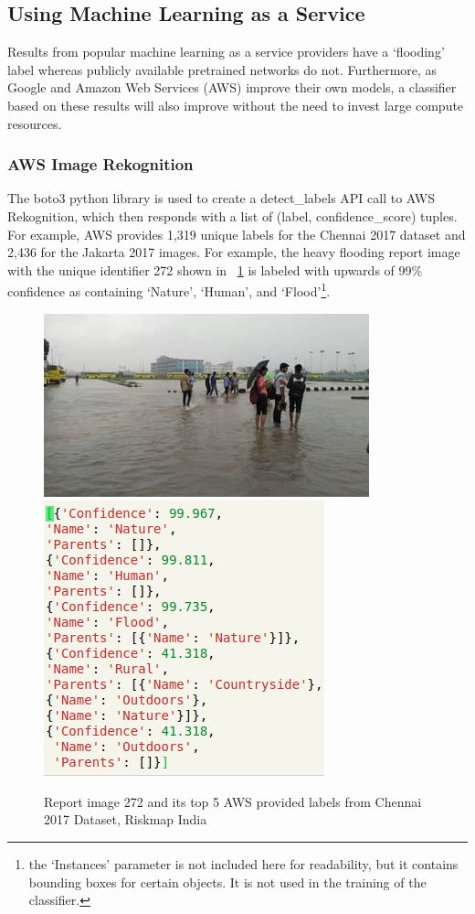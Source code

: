 \subsection{Using Machine Learning as a Service}
Results from popular machine learning as a service providers have a `flooding'
label whereas publicly available pretrained networks do not. Furthermore, as
Google and Amazon Web Services (AWS) improve their own models, a classifier
based on these results will also improve without the need to invest large
compute resources.

\subsubsection{AWS Image Rekognition}\label{chap4:aws}
The boto3 python library is used to create a detect\_labels API call 
to AWS Rekognition, which then responds with a list of (label,
confidence\_score) tuples. For example, AWS provides 1,319 unique labels for the
Chennai 2017 dataset and 2,436 for the Jakarta 2017 images. For example, the
heavy flooding report image with the unique identifier 272 shown in
\figureautorefname{}~\ref{fig:aws_272} is labeled with upwards of 99\% confidence as containing `Nature', `Human', and `Flood'\footnote{the `Instances' parameter is
not included here for readability, but it contains bounding boxes for certain
objects. It is not used in the training of the classifier.}.
\begin{figure}[ht]
    \centering
    \captionsetup{justification=centering}
    \includegraphics[scale=0.6]{images/ch/272.jpeg}
    \includegraphics[scale=0.6]{images/ch/aws_272.png}
    \caption{Report image 272 and its top 5 AWS provided labels from Chennai
    2017 Dataset, Riskmap India}\label{fig:aws_272}
\end{figure}

